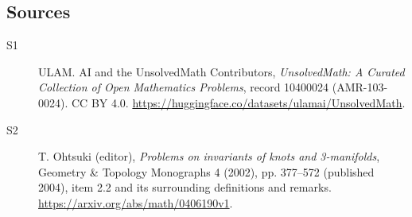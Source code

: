 \documentclass[11pt]{article}
\begin{document}
\subsection{Sources}
\begin{description}
\item[\hypertarget{source:10400024:1}{S1}] ULAM. AI and the UnsolvedMath Contributors, \emph{UnsolvedMath: A Curated Collection of Open Mathematics Problems}, record 10400024 (AMR-103-0024). CC BY 4.0. \url{https://huggingface.co/datasets/ulamai/UnsolvedMath}.
\item[\hypertarget{source:10400024:2}{S2}] T. Ohtsuki (editor), \emph{Problems on invariants of knots and 3-manifolds}, Geometry \& Topology Monographs 4 (2002), pp. 377--572 (published 2004), item 2.2 and its surrounding definitions and remarks. \url{https://arxiv.org/abs/math/0406190v1}.
\end{description}
\label{end:10400024}
\end{document}
